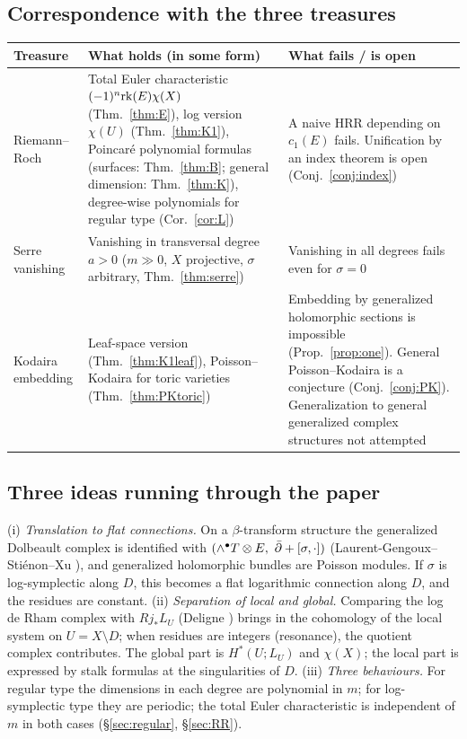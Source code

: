 \subsection{Correspondence with the three treasures}
\begin{center}\small
\begin{tabular}{>{\raggedright\arraybackslash}p{2.4cm}>{\raggedright\arraybackslash}p{6.5cm}>{\raggedright\arraybackslash}p{6.0cm}}
\toprule Treasure & What holds (in some form) & What fails / is open\\\midrule
Riemann--Roch & Total Euler characteristic $(-1)^n\mathrm{rk}(E)\chi(X)$ (Thm.\ \ref{thm:E}), log version $\chi(U)$ (Thm.\ \ref{thm:K1}), Poincar\'e polynomial formulas (surfaces: Thm.\ \ref{thm:B}; general dimension: Thm.\ \ref{thm:K}), degree-wise polynomials for regular type (Cor.\ \ref{cor:L}) & A naive HRR depending on $c_1(E)$ fails. Unification by an index theorem is open (Conj.\ \ref{conj:index})\\\midrule
Serre vanishing & Vanishing in transversal degree $a>0$ ($m\gg0$, $X$ projective, $\sigma$ arbitrary, Thm.\ \ref{thm:serre}) & Vanishing in all degrees fails even for $\sigma=0$\\\midrule
Kodaira embedding & Leaf-space version (Thm.\ \ref{thm:K1leaf}), Poisson--Kodaira for toric varieties (Thm.\ \ref{thm:PKtoric}) & Embedding by generalized holomorphic sections is impossible (Prop.\ \ref{prop:one}). General Poisson--Kodaira is a conjecture (Conj.\ \ref{conj:PK}). Generalization to general generalized complex structures not attempted\\\bottomrule
\end{tabular}
\end{center}

\subsection{Three ideas running through the paper}
(i) \emph{Translation to flat connections.} On a $\beta$-transform structure the generalized Dolbeault complex is identified with $(\wedge^\bullet T\otimes E,\ \dbar+[\sigma,\cdot])$ \tC (Laurent-Gengoux--Sti\'enon--Xu \cite{LGSX1}), and generalized holomorphic bundles are Poisson modules. If $\sigma$ is log-symplectic along $D$, this becomes a flat logarithmic connection along $D$, and the residues are constant.
(ii) \emph{Separation of local and global.} Comparing the log de Rham complex with $Rj_*L_U$ (Deligne \cite{Del}) brings in the cohomology of the local system on $U=X\setminus D$; when residues are integers (resonance), the quotient complex contributes. The global part is $H^*(U;L_U)$ and $\chi(X)$; the local part is expressed by stalk formulas at the singularities of $D$.
(iii) \emph{Three behaviours.} For regular type the dimensions in each degree are polynomial in $m$; for log-symplectic type they are periodic; the total Euler characteristic is independent of $m$ in both cases (\S\ref{sec:regular}, \S\ref{sec:RR}).

